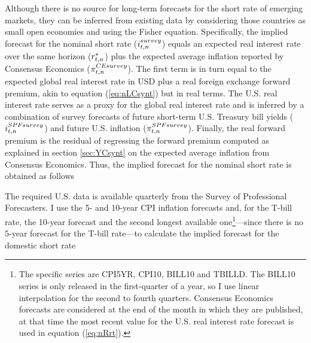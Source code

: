 {Although there is no source for long-term forecasts for the short rate of emerging markets, they can be inferred from existing data by considering those countries as small open economies and using the Fisher equation.  
Specifically, the implied forecast for the nominal short rate (\(i_{t,n}^{survey}\)) equals an expected real interest rate over the same horizon (\(r_{t,n}^{*}\)) plus the expected average inflation %
reported by Consensus Economics (\(\pi^{CE survey}_{t,n}\)).
The first term is in turn equal to the expected global real interest rate in USD plus a real foreign exchange forward premium, akin to equation (\ref{eq:nLCsynt}) but in real terms.
The U.S. real interest rate serves as a proxy for the global real interest rate and is inferred by a combination of survey forecasts of future short-term U.S. Treasury bill yields (\(i^{SPF survey}_{t,n}\)) and future U.S. inflation (\(\pi^{SPF survey}_{t,n}\)).
Finally, the real forward premium is the residual of regressing the forward premium computed as explained in section \ref{sec:YCsynt} on the expected average inflation from Consensus Economics. 
Thus, the implied forecast for the nominal short rate is obtained as follows

The required U.S. data is available quarterly from the Survey of Professional Forecasters.
I use the 5- and 10-year CPI inflation forecasts and, for the T-bill rate, the 10-year forecast and the second longest available one\footnote{ The specific series are CPI5YR, CPI10, BILL10 and TBILLD. The BILL10 series is only released in the first-quarter of a year, so I use linear interpolation for the second to fourth quarters. Consensus Economics forecasts are considered at the end of the month in which they are published, at that time the most recent value for the U.S. real interest rate forecast is used in equation (\ref{eq:nRrt}).}---since there is no 5-year forecast for the T-bill rate---to calculate the implied forecast for the domestic short rate
}
